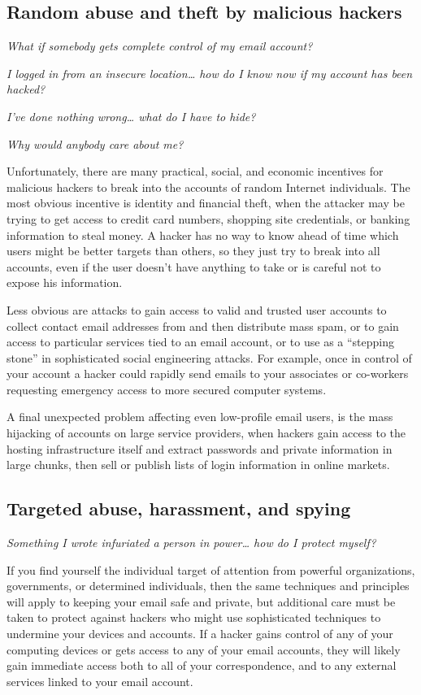 \subsection{Random abuse and theft by malicious hackers}

\emph{What if somebody gets complete control of my email account?}

\emph{I logged in from an insecure location\ldots{} how do I know now if
my account has been hacked?}

\emph{I've done nothing wrong\ldots{} what do I have to hide?}

\emph{Why would anybody care about me?}

Unfortunately, there are many practical, social, and economic incentives
for malicious hackers to break into the accounts of random Internet
individuals. The most obvious incentive is identity and financial theft,
when the attacker may be trying to get access to credit card numbers,
shopping site credentials, or banking information to steal money. A
hacker has no way to know ahead of time which users might be better
targets than others, so they just try to break into all accounts, even
if the user doesn't have anything to take or is careful not to expose
his information.

Less obvious are attacks to gain access to valid and trusted user
accounts to collect contact email addresses from and then distribute
mass spam, or to gain access to particular services tied to an email
account, or to use as a ``stepping stone'' in sophisticated social
engineering attacks. For example, once in control of your account a
hacker could rapidly send emails to your associates or co-workers
requesting emergency access to more secured computer systems.

A final unexpected problem affecting even low-profile email users, is
the mass hijacking of accounts on large service providers, when hackers
gain access to the hosting infrastructure itself and extract passwords
and private information in large chunks, then sell or publish lists of
login information in online markets.

\subsection{Targeted abuse, harassment, and spying}

\emph{Something I wrote infuriated a person in power\ldots{} how do I
protect myself?}

If you find yourself the individual target of attention from powerful
organizations, governments, or determined individuals, then the same
techniques and principles will apply to keeping your email safe and
private, but additional care must be taken to protect against hackers
who might use sophisticated techniques to undermine your devices and
accounts. If a hacker gains control of any of your computing devices or
gets access to any of your email accounts, they will likely gain
immediate access both to all of your correspondence, and to any external
services linked to your email account.

